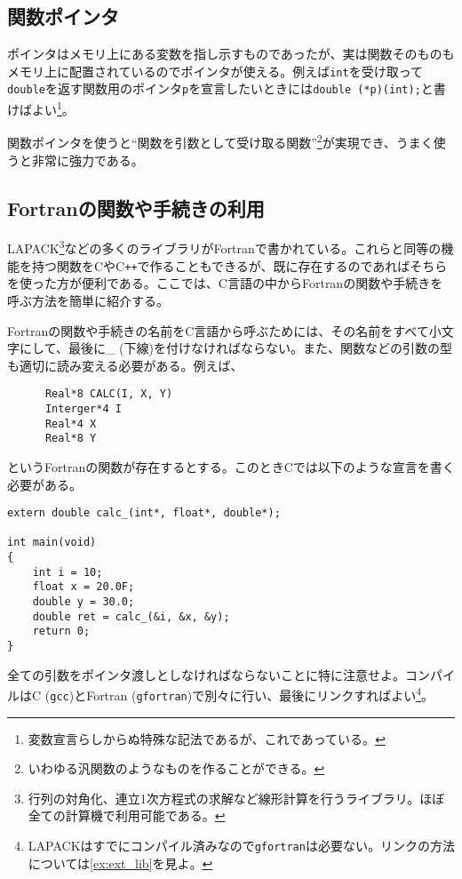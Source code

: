 \subsection{関数ポインタ}
ポインタはメモリ上にある変数を指し示すものであったが、実は関数そのものもメモリ上に配置されているのでポインタが使える。例えば\texttt{int}を受け取って\texttt{double}を返す関数用のポインタ\texttt{p}を宣言したいときには\texttt{double (*p)(int);}と書けばよい\footnote{変数宣言らしからぬ特殊な記法であるが、これであっている。}。

関数ポインタを使うと``関数を引数として受け取る関数''\footnote{いわゆる汎関数のようなものを作ることができる。}が実現でき、うまく使うと非常に強力である。

\subsection {Fortranの関数や手続きの利用}

LAPACK\footnote{行列の対角化、連立1次方程式の求解など線形計算を行うライブラリ。ほぼ全ての計算機で利用可能である。}などの多くのライブラリがFortranで書かれている。これらと同等の機能を持つ関数をCやC\texttt{++}で作ることもできるが、既に存在するのであればそちらを使った方が便利である。ここでは、C言語の中からFortranの関数や手続きを呼ぶ方法を簡単に紹介する。

Fortranの関数や手続きの名前をC言語から呼ぶためには、その名前をすべて小文字にして、最後に\_ (下線)を付けなければならない。また、関数などの引数の型も適切に読み変える必要がある。例えば、
\begin{reidai}\label{ex:fort}
    \begin{verbatim}
      Real*8 CALC(I, X, Y)
      Interger*4 I
      Real*4 X
      Real*8 Y
\end{verbatim}
\end{reidai} \noindent
というFortranの関数が存在するとする。このときCでは以下のような宣言を書く必要がある。
\begin{reidai}
    \begin{verbatim}
extern double calc_(int*, float*, double*);

int main(void)
{
    int i = 10;
    float x = 20.0F;
    double y = 30.0;
    double ret = calc_(&i, &x, &y);
    return 0;
}
\end{verbatim}
\end{reidai} \noindent
全ての引数をポインタ渡しとしなければならないことに特に注意せよ。コンパイルはC (\texttt{gcc})とFortran (\texttt{gfortran})で別々に行い、最後にリンクすればよい\footnote{LAPACKはすでにコンパイル済みなので\texttt{gfortran}は必要ない。リンクの方法については\ref{ex:ext_lib}を見よ。}。

